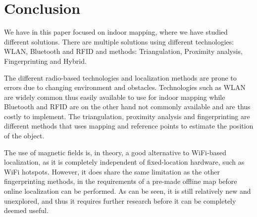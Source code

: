 \section{Conclusion}
We have in this paper focused on indoor mapping, where we have studied different solutions.
There are multiple solutions using different technologies: WLAN, Bluetooth and RFID and methods: Triangulation, Proximity analysis, Fingerprinting and Hybrid.

The different radio-based technologies and localization methods are prone to errors due to changing environment and obstacles.
Technologies such as WLAN are widely common thus easily available to use for indoor mapping while Bluetooth and RFID are on the other hand not commonly available and are thus costly to implement.
The triangulation, proximity analysis and fingerprinting are different methods that uses mapping and reference points to estimate the position of the object.

The use of magnetic fields is, in theory, a good alternative to WiFi-based localization, as it is completely independent of fixed-location hardware, such as WiFi hotspots.
However, it does share the same limitation as the other fingerprinting methods, in the requirements of a pre-made offline map before online localization can be performed.
As can be seen, it is still relatively new and unexplored, and thus it requires further research before it can be completely deemed useful.
